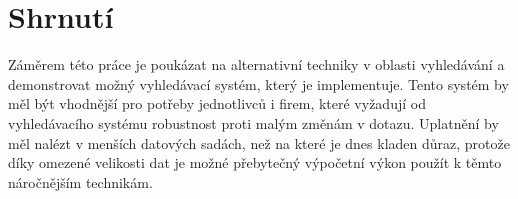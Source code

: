 \documentclass[11pt,letterpaper,oneside,openright]{book}
\newcommand{\bftt}[1]{\texttt{\textbf{#1}}}
\begin{document}
%
%


\section{Shrnutí}
Záměrem této práce je poukázat na alternativní techniky v oblasti vyhledávání a
demonstrovat možný vyhledávací systém, který je implementuje. Tento systém by
měl být vhodnější pro potřeby jednotlivců i firem, které vyžadují od
vyhledávacího systému robustnost proti malým změnám v dotazu. Uplatnění by měl
nalézt v menších datových sadách, než na které je dnes kladen důraz, protože
díky omezené velikosti dat je možné přebytečný výpočetní výkon použít k těmto
náročnějším technikám.

\end{document}
